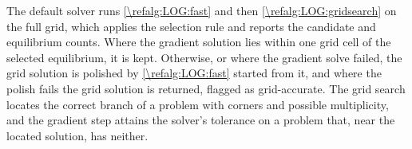 The default solver runs \cref{\refalg:LOG:fast} and then \cref{\refalg:LOG:gridsearch} on the full grid, which applies the selection rule and reports the candidate and equilibrium counts. Where the gradient solution lies within one grid cell of the selected equilibrium, it is kept. Otherwise, or where the gradient solve failed, the grid solution is polished by \cref{\refalg:LOG:fast} started from it, and where the polish fails the grid solution is returned, flagged as grid-accurate. The grid search locates the correct branch of a problem with corners and possible multiplicity, and the gradient step attains the solver's tolerance on a problem that, near the located solution, has neither.
